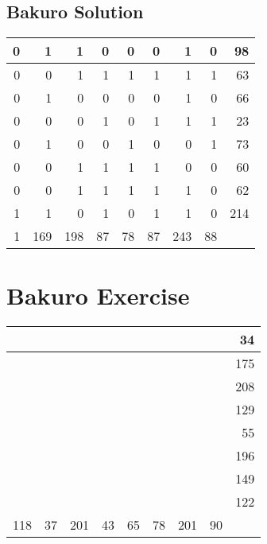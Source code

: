 \documentclass[]{article}
\begin{document}
 \subsection{Bakuro Solution} 
\begin{tabular}{rrrrrrrrr}
\hline
 0 &   1 &   1 &  0 &  0 &  0 &   1 &  0 &  98 \\ \hline
 0 &   0 &   1 &  1 &  1 &  1 &   1 &  1 &  63 \\ \hline
 0 &   1 &   0 &  0 &  0 &  0 &   1 &  0 &  66 \\ \hline
 0 &   0 &   0 &  1 &  0 &  1 &   1 &  1 &  23 \\ \hline
 0 &   1 &   0 &  0 &  1 &  0 &   0 &  1 &  73 \\ \hline
 0 &   0 &   1 &  1 &  1 &  1 &   0 &  0 &  60 \\ \hline
 0 &   0 &   1 &  1 &  1 &  1 &   1 &  0 &  62 \\ \hline
 1 &   1 &   0 &  1 &  0 &  1 &   1 &  0 & 214 \\ \hline
 1 & 169 & 198 & 87 & 78 & 87 & 243 & 88 &     \\ \hline
\hline
\end{tabular}\newpage\section{Bakuro Exercise}\begin{tabular}{rrrrrrrrr}
\hline
     &    &     &    &    &    &     &    &  34 \\ \hline
     &    &     &    &    &    &     &    & 175 \\ \hline
     &    &     &    &    &    &     &    & 208 \\ \hline
     &    &     &    &    &    &     &    & 129 \\ \hline
     &    &     &    &    &    &     &    &  55 \\ \hline
     &    &     &    &    &    &     &    & 196 \\ \hline
     &    &     &    &    &    &     &    & 149 \\ \hline
     &    &     &    &    &    &     &    & 122 \\ \hline
 118 & 37 & 201 & 43 & 65 & 78 & 201 & 90 &     \\ \hline
\hline
\end{tabular}\newpage 
\end{document}
